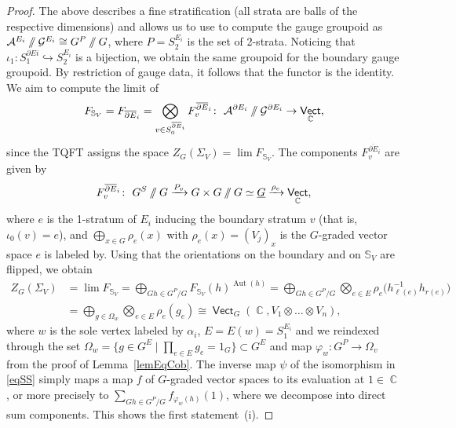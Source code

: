 \documentclass[10pt,a4paper]{amsart}
\DeclareMathOperator{\Aut}{Aut}
\DeclareMathOperator{\vect}{\mathsf{Vect}}
\DeclareMathOperator{\C}{\mathbb{C}}
\newcommand{\sslash}{\mathbin{/\mkern-6mu/}}
\numberwithin{equation}{section}
\theoremstyle{definition}
\begin{document}
\begin{proof}
 The above describes a fine stratification (all strata are balls of the respective dimensions) and allows us to use \cite[Corollary~5.23]{FMM} to compute the gauge groupoid as $\mathcal{A}^{E_i}\sslash \mathcal{G}^{E_i} \cong G^P \sslash G$, where $P = S_2^{E_i}$ is the set of 2-strata. Noticing that $\iota_1\colon S_1^{\partial Ei} \hookrightarrow S_2^{E_i}$ is a bijection, we obtain the same groupoid for the boundary gauge groupoid. By restriction of gauge data, it follows that the functor \smash{$P_{\partial}\colon \mathcal{A}^{E_i}\sslash \mathcal{G}^{E_i} \rightarrow \mathcal{A}^{\partial E_i}\sslash \mathcal{G}^{\partial E_i}$} is the identity. We aim to compute the limit of
 \begin{align*}
 F_{\mathbb{S}_V} = F_{\overline{\partial E}_i} = \bigotimes_{v \in S_0^{\overline{\partial E}_i}} F_v^{\overline{\partial E}_i}\colon \ \mathcal{A}^{\partial E_i}\sslash \mathcal{G}^{\partial E_i} \rightarrow \vect_{\C},
 \end{align*}
 since the TQFT assigns the space $Z_G(\Sigma_V)= \lim F_{\mathbb{S}_V}$. The components $F_v^{\overline{\partial E}_i}$ are given by
 \begin{align*}
 F_v^{\overline{\partial E}_i} \colon \ G^S \sslash G \xrightarrow{P_v} G \times G \sslash G \simeq \underline{G} \xrightarrow{\rho_e} \vect_{\C},
 \end{align*}
 where $e$ is the 1-stratum of $E_i$ inducing the boundary stratum $v$ (that is, $\iota_0(v) = e$), and $\bigoplus_{x \in G}\rho_e(x)$ with $\rho_e(x) = (V_j)_x$ is the $G$-graded vector space $e$ is labeled by. Using that the orientations on the boundary and on $\mathbb{S}_V$ are flipped, we obtain
 \begin{align}
 Z_G(\Sigma_V) &= \lim F_{\mathbb{S}_V} = \bigoplus_{Gh \in G^P/G} F_{\mathbb{S}_V}(h)^{\Aut(h)} = \bigoplus_{Gh \in G^P/G} \bigotimes_{e \in E} \rho_e\bigl(h_{\ell(e)}^{-1} h_{r(e)}\bigr) \nonumber \\ &= \bigoplus_{g \in \Omega_w} \bigotimes_{e \in E} \rho_e(g_e) \cong \vect_G(\C, V_1 \otimes \dots \otimes V_n),\label{eqSS}
 \end{align}
 where $w$ is the sole vertex labeled by $\alpha_i$, $E = E(w) = S_1^{E_i}$ and we reindexed through the set $\Omega_w = \big\{g \in G^E \mid \prod_{e \in E}g_e = 1_G \big\} \subset G^E$ and map $\varphi_w\colon G^P \rightarrow \Omega_v$ from the proof of Lemma~\ref{lemEqCob}. The inverse map $\psi$ of the isomorphism in \eqref{eqSS} simply maps a map $f$ of $G$-graded vector spaces to its evaluation at $1 \in \C$, or more precisely to $\sum_{Gh \in G^P/G}f_{\varphi_w(h)}(1)$, where we decompose into direct sum components. This shows the first statement~(i).


\end{proof}
\end{document}
